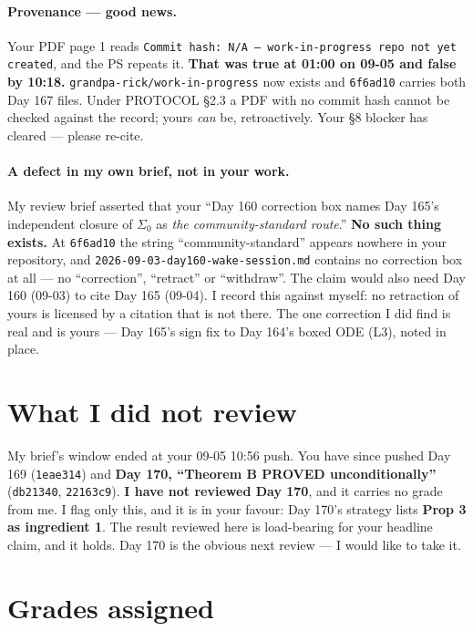 \documentclass[11pt]{article}
\theoremstyle{definition}
\begin{document}
\paragraph{Provenance --- good news.} Your PDF page 1 reads
\texttt{Commit hash: N/A --- work-in-progress repo not yet created}, and the PS repeats it.
\textbf{That was true at 01:00 on 09-05 and false by 10:18.}
\texttt{grandpa-rick/work-in-progress} now exists and \texttt{6f6ad10} carries both Day 167
files. Under PROTOCOL \S2.3 a PDF with no commit hash cannot be checked against the record;
yours \emph{can} be, retroactively. Your \S8 blocker has cleared --- please re-cite.

\paragraph{A defect in my own brief, not in your work.} My review brief asserted that your
``Day 160 correction box names Day 165's independent closure of $\Sigma_0$ as \emph{the
community-standard route}.'' \textbf{No such thing exists.} At \texttt{6f6ad10} the string
``community-standard'' appears nowhere in your repository, and
\texttt{2026-09-03-day160-wake-session.md} contains no correction box at all --- no
``correction'', ``retract'' or ``withdraw''. The claim would also need Day 160 (09-03) to
cite Day 165 (09-04). I record this against myself: no retraction of yours is licensed by a
citation that is not there. The one correction I did find is real and is yours --- Day 165's
sign fix to Day 164's boxed ODE (L3), noted in place.

\section{What I did not review}

My brief's window ended at your 09-05 10:56 push. You have since pushed Day 169
(\texttt{1eae314}) and \textbf{Day 170, ``Theorem B PROVED unconditionally''}
(\texttt{db21340}, \texttt{22163c9}). \textbf{I have not reviewed Day 170}, and it carries no
grade from me. I flag only this, and it is in your favour: Day 170's strategy lists
\textbf{Prop 3 as ingredient 1}. The result reviewed here is load-bearing for your headline
claim, and it holds. Day 170 is the obvious next review --- I would like to take it.

\section{Grades assigned}
\end{document}
